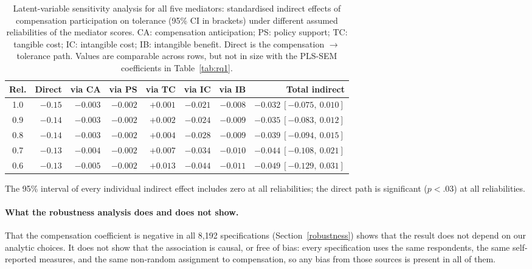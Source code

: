 \begin{table}[htbp]
\centering
\caption{Latent-variable sensitivity analysis for all five mediators:
standardised indirect effects of compensation participation on tolerance
(95\% CI in brackets) under different assumed reliabilities of the mediator
scores. CA: compensation anticipation; PS: policy support; TC: tangible cost;
IC: intangible cost; IB: intangible benefit. Direct is the compensation
$\rightarrow$ tolerance path. Values are comparable across rows, but not in
size with the PLS-SEM coefficients in Table~\ref{tab:rq1}.}
\label{tab:latent}
\small
\begin{tabular}{crrrrrrr}
\hline
\textbf{Rel.} & \textbf{Direct} & \textbf{via CA} & \textbf{via PS} & \textbf{via TC} & \textbf{via IC} & \textbf{via IB} & \textbf{Total indirect} \\
\hline
1.0 & $-0.15$ & $-0.003$ & $-0.002$ & $+0.001$ & $-0.021$ & $-0.008$ & $-0.032\ [-0.075,\ 0.010]$ \\
0.9 & $-0.14$ & $-0.003$ & $-0.002$ & $+0.002$ & $-0.024$ & $-0.009$ & $-0.035\ [-0.083,\ 0.012]$ \\
0.8 & $-0.14$ & $-0.003$ & $-0.002$ & $+0.004$ & $-0.028$ & $-0.009$ & $-0.039\ [-0.094,\ 0.015]$ \\
0.7 & $-0.13$ & $-0.004$ & $-0.002$ & $+0.007$ & $-0.034$ & $-0.010$ & $-0.044\ [-0.108,\ 0.021]$ \\
0.6 & $-0.13$ & $-0.005$ & $-0.002$ & $+0.013$ & $-0.044$ & $-0.011$ & $-0.049\ [-0.129,\ 0.031]$ \\
\hline
\end{tabular}

\smallskip
\footnotesize The 95\% interval of every individual indirect effect includes zero at all
reliabilities; the direct path is significant ($p < .03$) at all reliabilities.
\end{table}

\paragraph{What the robustness analysis does and does not show.} That the
compensation coefficient is negative in all 8{,}192 specifications
(Section~\ref{robustness}) shows that the result does not depend on our
analytic choices. It does not show that the association is causal, or free
of bias: every specification uses the same respondents, the same
self-reported measures, and the same non-random assignment to compensation,
so any bias from those sources is present in all of them.

